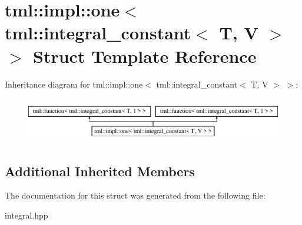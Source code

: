 \hypertarget{structtml_1_1impl_1_1one_3_01tml_1_1integral__constant_3_01T_00_01V_01_4_01_4}{\section{tml\+:\+:impl\+:\+:one$<$ tml\+:\+:integral\+\_\+constant$<$ T, V $>$ $>$ Struct Template Reference}
\label{structtml_1_1impl_1_1one_3_01tml_1_1integral__constant_3_01T_00_01V_01_4_01_4}
}
Inheritance diagram for tml\+:\+:impl\+:\+:one$<$ tml\+:\+:integral\+\_\+constant$<$ T, V $>$ $>$\+:\begin{figure}[H]
\begin{center}
\leavevmode
\includegraphics[height=2.000000cm]{structtml_1_1impl_1_1one_3_01tml_1_1integral__constant_3_01T_00_01V_01_4_01_4}
\end{center}
\end{figure}
\subsection*{Additional Inherited Members}


The documentation for this struct was generated from the following file\+:\begin{DoxyCompactItemize}
\item 
integral.\+hpp\end{DoxyCompactItemize}
